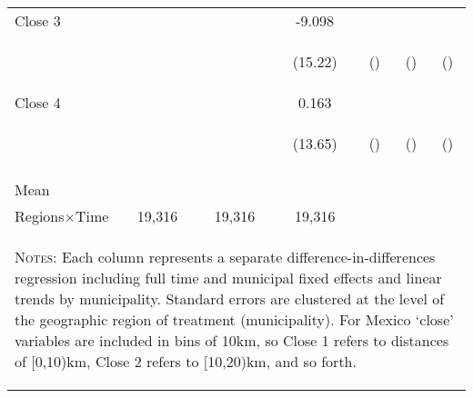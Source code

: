 \begin{table}[htpb!]
\begin{center}
{\begin{tabular}{lcccccc}
Close 3 &&&-9.098&&& \\
\vspace{4pt} & \begin{footnotesize}\end{footnotesize} & \begin{footnotesize}\end{footnotesize} & \begin{footnotesize}(15.22)\end{footnotesize}&()&()&() \\
Close 4 &&&0.163&&& \\
\vspace{4pt} & \begin{footnotesize}\end{footnotesize} & \begin{footnotesize}\end{footnotesize} & \begin{footnotesize}(13.65)\end{footnotesize} &()&()&() \\
\vspace{4pt} & \begin{footnotesize}\end{footnotesize} & \begin{footnotesize}\end{footnotesize} & \begin{footnotesize}\end{footnotesize} & \begin{footnotesize}\end{footnotesize} & \begin{footnotesize}\end{footnotesize} & \begin{footnotesize}\end{footnotesize} \\
Mean & & & & & & \\
Regions$\times$Time & 19,316 & 19,316 & 19,316 & & & \\ \midrule
\multicolumn{7}{p{13.2cm}}{\begin{footnotesize}\textsc{Notes:} Each column represents a separate difference-in-differences regression including full time and municipal fixed effects and linear trends
by municipality.  Standard errors are clustered at the level of the geographic region of treatment (municipality). For Mexico `close' variables are included in bins of 10km, so Close 1 refers to
distances of [0,10)km, Close 2 refers to [10,20)km, and so forth. \end{footnotesize}} \\ \bottomrule
\end{tabular}}
\end{center}
\end{table}
